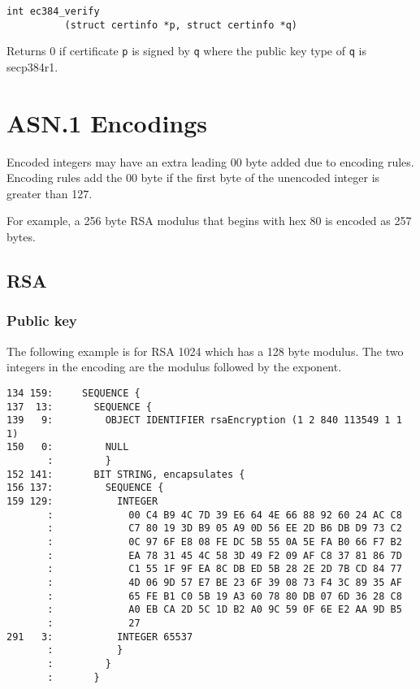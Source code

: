 \documentclass[12pt]{article}
\begin{document}
\bigskip
\bigskip
\begin{verbatim}
int ec384_verify
          (struct certinfo *p, struct certinfo *q)
\end{verbatim}

\noindent
Returns 0 if certificate {\tt p} is signed by {\tt q}
where the public key type of {\tt q} is secp384r1.

\newpage
\section{ASN.1 Encodings}

\noindent
Encoded integers may have an extra leading 00 byte added due to encoding rules.
Encoding rules add the 00 byte if the first byte of the unencoded integer is greater than 127.

\bigskip
\noindent
For example, a 256 byte RSA modulus that begins with hex 80 is encoded as 257 bytes.

\newpage
\subsection{RSA}

\subsubsection{Public key}

\noindent
The following example is for RSA 1024 which has a 128 byte modulus.
The two integers in the encoding are the modulus followed by the exponent.

\begin{verbatim}
134 159:     SEQUENCE {
137  13:       SEQUENCE {
139   9:         OBJECT IDENTIFIER rsaEncryption (1 2 840 113549 1 1 1)
150   0:         NULL
       :         }
152 141:       BIT STRING, encapsulates {
156 137:         SEQUENCE {
159 129:           INTEGER
       :             00 C4 B9 4C 7D 39 E6 64 4E 66 88 92 60 24 AC C8
       :             C7 80 19 3D B9 05 A9 0D 56 EE 2D B6 DB D9 73 C2
       :             0C 97 6F E8 08 FE DC 5B 55 0A 5E FA B0 66 F7 B2
       :             EA 78 31 45 4C 58 3D 49 F2 09 AF C8 37 81 86 7D
       :             C1 55 1F 9F EA 8C DB ED 5B 28 2E 2D 7B CD 84 77
       :             4D 06 9D 57 E7 BE 23 6F 39 08 73 F4 3C 89 35 AF
       :             65 FE B1 C0 5B 19 A3 60 78 80 DB 07 6D 36 28 C8
       :             A0 EB CA 2D 5C 1D B2 A0 9C 59 0F 6E E2 AA 9D B5
       :             27
291   3:           INTEGER 65537
       :           }
       :         }
       :       }
\end{verbatim}
\end{document}
